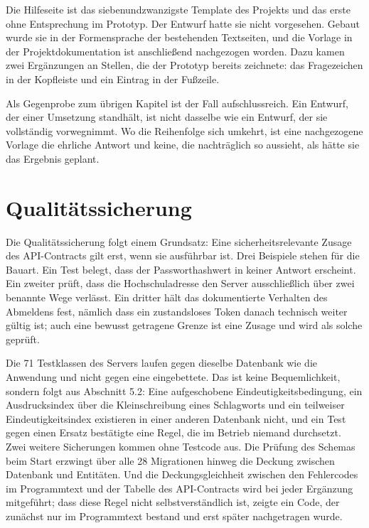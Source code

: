 Die Hilfeseite ist das siebenundzwanzigste Template des Projekts und das erste ohne Entsprechung im Prototyp. Der Entwurf hatte sie nicht vorgesehen. Gebaut wurde sie in der Formensprache der bestehenden Textseiten, und die Vorlage in der Projektdokumentation ist anschließend nachgezogen worden. Dazu kamen zwei Ergänzungen an Stellen, die der Prototyp bereits zeichnete: das Fragezeichen in der Kopfleiste und ein Eintrag in der Fußzeile.

Als Gegenprobe zum übrigen Kapitel ist der Fall aufschlussreich. Ein Entwurf, der einer Umsetzung standhält, ist nicht dasselbe wie ein Entwurf, der sie vollständig vorwegnimmt. Wo die Reihenfolge sich umkehrt, ist eine nachgezogene Vorlage die ehrliche Antwort und keine, die nachträglich so aussieht, als hätte sie das Ergebnis geplant.

\section{Qualitätssicherung}
\label{sec:qualitaetssicherung}

Die Qualitätssicherung folgt einem Grundsatz: Eine sicherheitsrelevante Zusage des API-Contracts gilt erst, wenn sie ausführbar ist. Drei Beispiele stehen für die Bauart. Ein Test belegt, dass der Passworthashwert in keiner Antwort erscheint. Ein zweiter prüft, dass die Hochschuladresse den Server ausschließlich über zwei benannte Wege verlässt. Ein dritter hält das dokumentierte Verhalten des Abmeldens fest, nämlich dass ein zustandsloses Token danach technisch weiter gültig ist; auch eine bewusst getragene Grenze ist eine Zusage und wird als solche geprüft.

Die 71 Testklassen des Servers laufen gegen dieselbe Datenbank wie die Anwendung und nicht gegen eine eingebettete. Das ist keine Bequemlichkeit, sondern folgt aus Abschnitt 5.2: Eine aufgeschobene Eindeutigkeitsbedingung, ein Ausdrucksindex über die Kleinschreibung eines Schlagworts und ein teilweiser Eindeutigkeitsindex existieren in einer anderen Datenbank nicht, und ein Test gegen einen Ersatz bestätigte eine Regel, die im Betrieb niemand durchsetzt. Zwei weitere Sicherungen kommen ohne Testcode aus. Die Prüfung des Schemas beim Start erzwingt über alle 28 Migrationen hinweg die Deckung zwischen Datenbank und Entitäten. Und die Deckungsgleichheit zwischen den Fehlercodes im Programmtext und der Tabelle des API-Contracts wird bei jeder Ergänzung mitgeführt; dass diese Regel nicht selbstverständlich ist, zeigte ein Code, der zunächst nur im Programmtext bestand und erst später nachgetragen wurde.

